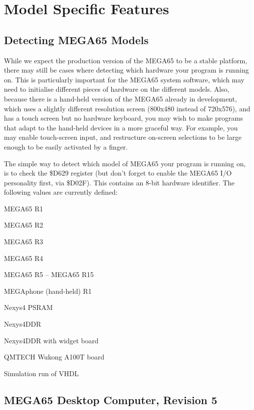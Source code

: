 \chapter{Model Specific Features}

\section{Detecting MEGA65 Models}

While we expect the production version of the MEGA65 to be a stable platform, there may still be
cases where detecting which hardware your program is running on. This is particularly important
for the MEGA65 system software, which may need to initialise different pieces of hardware on the
different models.  Also, because there is a hand-held version of the MEGA65 already  in development,
which uses a slightly different resolution screen (800x480 instead of 720x576), and has a touch
screen but no hardware keyboard, you may wish to make programs that adapt to the hand-held
devices in a more graceful way. For example, you may enable touch-screen input, and restructure
on-screen selections to be large enough to be easily activated by a finger.

The simple way to detect which model of MEGA65 your program is running on, is to check the
\$D629 register (but don't forget to enable the MEGA65 I/O personality first, via \$D02F).
This contains an 8-bit hardware identifier.  The following values are currently defined:

\begin{description}[align=left,labelwidth=0.2cm]
\item[\$01 (1)] MEGA65 R1
\item[\$02 (2)] MEGA65 R2
\item[\$03 (3)] MEGA65 R3
\item[\$04 (4)] MEGA65 R4
\item[\$05 -- \$0F (5 -- 15)] MEGA65 R5 -- MEGA65 R15
\item[\$21 (33)] MEGAphone (hand-held) R1
\item[\$40 (64)] Nexys4 PSRAM
\item[\$41 (65)] Nexys4DDR
\item[\$42 (66)] Nexys4DDR with widget board
\item[\$FD (253)] QMTECH Wukong A100T board
\item[\$FE (254)] Simulation run of VHDL
\end{description}


\section{MEGA65 Desktop Computer, Revision 5}

